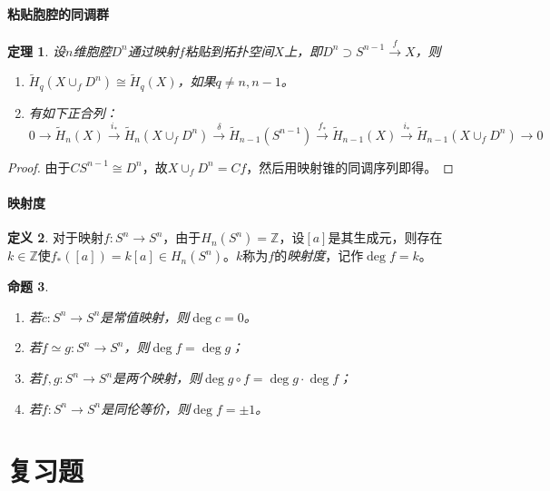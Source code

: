 \documentclass[UTF-8,11pt,fancyhdr,hyperref,titlepage]{ctexart}
\newcommand{\red}{\color{red}}
\theoremstyle{question}
\theoremstyle{theorem}
\newtheorem{thm}{定理}
\newtheorem{prop}[thm]{命题}
\theoremstyle{definition}
\newtheorem{defn}[thm]{定义}
\theoremstyle{remark}
\def\ZZ{{\mathbb Z}}
\def\longto{\longrightarrow}
\def\To{\longto}
\newcommand{\markar}[1]{\stackrel{{#1}}{\longrightarrow}}%
\newcommand{\rH}[1]{\widetilde{H}_{#1}}
\begin{document}
\subsection{粘贴胞腔的同调群}
\begin{thm}\label{粘贴胞腔}
  设$n$维胞腔$D^n$通过映射$f$粘贴到拓扑空间$X$上，即$D^n\supset S^{n-1}\markar{f}X$，则
    \begin{enumerate}[1)]
    \setlength{\itemindent}{2ex}
    \item $\rH{q}(X\cup_fD^n)\cong\rH{q}(X)$，如果$q\neq n,n-1$。
    \item 有如下正合列：
    \begin{equation*}
      0\To\rH{n}(X)\markar{i_{\ast}}\rH{n}(X\cup_fD^n)\markar{\delta}\rH{n-1}(S^{n-1})\markar{f_{\ast}}\rH{n-1}(X)\markar{i_{\ast}}\rH{n-1}(X\cup_fD^n)\To 0
    \end{equation*}
  \end{enumerate}
\end{thm}
\begin{proof}
  由于$CS^{n-1}\cong D^n$，故$X\cup_fD^n=Cf$，然后用映射锥的同调序列即得。
\end{proof}

\subsection{映射度}
\begin{defn}
  对于映射$f\colon S^n\To S^n$，由于$H_n(S^n)=\ZZ$，设$[a]$是其生成元，则存在$k\in\ZZ$使$f_{\ast}([a])=k[a]\in H_n(S^n)$。$k$称为$f$的\emph{\red 映射度}，记作$\deg f=k$。
\end{defn}
\begin{prop}
    \begin{enumerate}[1)]
    \setlength{\itemindent}{2ex}
    \item 若$c\colon S^n\To S^n$是常值映射，则$\deg c=0$。
    \item 若$f\simeq g\colon S^n\To S^n$，则$\deg f=\deg g$；
    \item 若$f,g\colon S^n\To S^n$是两个映射，则$\deg g\circ f=\deg g\cdot\deg f$；
    \item 若$f\colon S^n\To S^n$是同伦等价，则$\deg f=\pm1$。
  \end{enumerate}  
\end{prop}

\newpage
\part{复习题}
\end{document}
